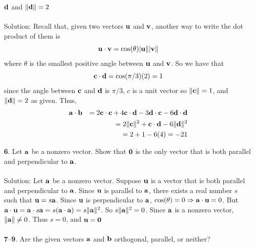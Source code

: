 \documentclass[12pt]{amsbook}
\begin{document}
\begin{enumerate}
${\bf d}$ and $\|{\bf d}\|=2$
\\
\\
{\sc Solution}:
Recall that, given two vectors ${\bf u}$ and ${\bf v}$, another way to write the dot product of them is
$${\bf u}\cdot{\bf v}=\cos(\theta)|{\bf u}\||{\bf v}\|$$
where $\theta$ is the smallest positive angle between ${\bf u}$ and ${\bf v}$. So we have that  
$${\bf c}\cdot{\bf d}=\cos(\pi/3)(2)=1$$
since the angle between ${\bf c}$ and ${\bf d}$ is $\pi/3$, $c$ is a unit vector so $\|{\bf c}\|=1$, and $\|{\bf d}\|=2$ as given. Thus,
\begin{eqnarray*}
{\bf a}\cdot{\bf b}&&=2{\bf c}\cdot{\bf c}+4{\bf c}\cdot{\bf d}-3{\bf d}\cdot{\bf c}-6{\bf d}\cdot{\bf d} \\
&&= 2\|{\bf c}\|^2 +{\bf c}\cdot{\bf d}-6\|{\bf d}\|^2\\
&&=2+1-6(4)=-21
\end{eqnarray*}
\end{enumerate}
{\small\bf 6}. Let ${\bf a}$ be a nonzero vector. Show that ${\bf 0}$
is the only vector that is both parallel and perpendicular 
to ${\bf a}$.\\
\\
{\sc Solution}:
Let $\bf a$ be a nonzero vector. Suppose $\bf u$ is a vector that is both parallel and perpendicular to $\bf a$. Since $\bf u$ is parallel to $\bf a$, there exists a real number $s$ such that ${\bf u}=s\bf a$. Since $\bf u$ is perpendicular to $\bf a$, $\cos(\theta)=0 \Rightarrow {\bf a}\cdot{\bf u} =0$. But ${\bf a}\cdot{\bf u} = {\bf a}\cdot{s\bf a} = s({\bf a}\cdot{\bf a})=s\|{\bf a}\|^2$. So $s\|{\bf a}\|^2=0$. Since $\bf a$ is a nonzero vector, $\|{\bf a}\| \neq 0$. Thus $s=0$, and $\bf u =0$
\\
\\
{\small\bf 7}--{\bf 9}. Are the given vectors ${\bf a}$ and ${\bf b}$ orthogonal,
parallel, or neither?
\end{document}
